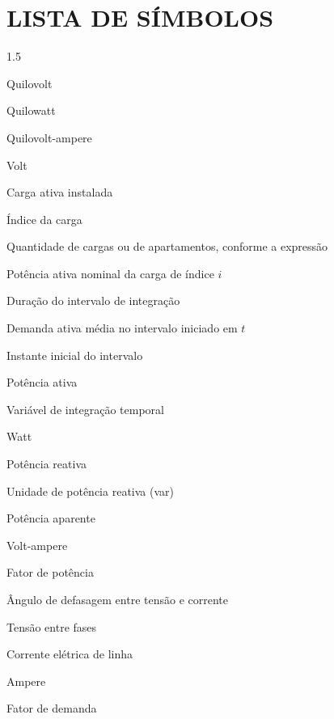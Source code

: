\cleardoublepage
{}
\chapter*{LISTA DE SÍMBOLOS}
\begin{Spacing}{1.5}
\begin{list}{}{\setlength{\labelwidth}{2.6cm}\setlength{\leftmargin}{3.0cm}\setlength{\labelsep}{0.4cm}\setlength{\itemsep}{0pt}\setlength{\parsep}{0pt}\setlength{\topsep}{0pt}\renewcommand{\makelabel}[1]{#1\hfill}}
  \item[kV] Quilovolt
  \item[kW] Quilowatt
  \item[kVA] Quilovolt-ampere
  \item[V] Volt
  \item[$P_{\mathrm{inst}}$] Carga ativa instalada
  \item[$i$] Índice da carga
  \item[$n$] Quantidade de cargas ou de apartamentos, conforme a expressão
  \item[$P_{\mathrm{n},i}$] Potência ativa nominal da carga de índice $i$
  \item[$\Delta t$] Duração do intervalo de integração
  \item[$D_{\mathrm{P}}(t)$] Demanda ativa média no intervalo iniciado em $t$
  \item[$t$] Instante inicial do intervalo
  \item[$P$] Potência ativa
  \item[$\tau$] Variável de integração temporal
  \item[W] Watt
  \item[$Q$] Potência reativa
  \item[var] Unidade de potência reativa (var)
  \item[$S$] Potência aparente
  \item[VA] Volt-ampere
  \item[$\mathrm{FP}$] Fator de potência
  \item[$\varphi$] Ângulo de defasagem entre tensão e corrente
  \item[$V_{\mathrm{LL}}$] Tensão entre fases
  \item[$I$] Corrente elétrica de linha
  \item[A] Ampere
  \item[$F_d$] Fator de demanda

\end{list}
\end{Spacing}
